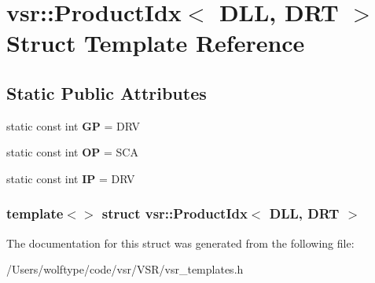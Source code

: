\hypertarget{structvsr_1_1_product_idx_3_01_d_l_l_00_01_d_r_t_01_4}{\section{vsr\-:\-:Product\-Idx$<$ D\-L\-L, D\-R\-T $>$ Struct Template Reference}
\label{structvsr_1_1_product_idx_3_01_d_l_l_00_01_d_r_t_01_4}
}
\subsection*{Static Public Attributes}
\begin{DoxyCompactItemize}
\item 
\hypertarget{structvsr_1_1_product_idx_3_01_d_l_l_00_01_d_r_t_01_4_a1f7b06c3671e705e2e3b10e688e7684c}{static const int {\bfseries G\-P} = D\-R\-V}\label{structvsr_1_1_product_idx_3_01_d_l_l_00_01_d_r_t_01_4_a1f7b06c3671e705e2e3b10e688e7684c}

\item 
\hypertarget{structvsr_1_1_product_idx_3_01_d_l_l_00_01_d_r_t_01_4_ac61506890da5b4b56d695225db38dbab}{static const int {\bfseries O\-P} = S\-C\-A}\label{structvsr_1_1_product_idx_3_01_d_l_l_00_01_d_r_t_01_4_ac61506890da5b4b56d695225db38dbab}

\item 
\hypertarget{structvsr_1_1_product_idx_3_01_d_l_l_00_01_d_r_t_01_4_a32f13a3deb8384af67fd6aacfc1200a4}{static const int {\bfseries I\-P} = D\-R\-V}\label{structvsr_1_1_product_idx_3_01_d_l_l_00_01_d_r_t_01_4_a32f13a3deb8384af67fd6aacfc1200a4}

\end{DoxyCompactItemize}
\subsubsection*{template$<$$>$ struct vsr\-::\-Product\-Idx$<$ D\-L\-L, D\-R\-T $>$}



The documentation for this struct was generated from the following file\-:\begin{DoxyCompactItemize}
\item 
/\-Users/wolftype/code/vsr/\-V\-S\-R/vsr\-\_\-templates.\-h\end{DoxyCompactItemize}
